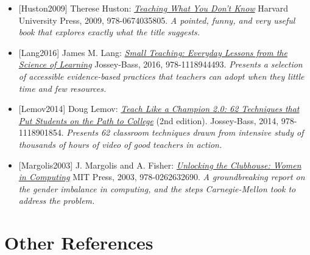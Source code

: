 \documentclass[10pt,statementpaper]{memoir}
\begin{document}
\begin{itemize}
{  Design of Computing Education: Research on Computing for Everyone}
  Morgan \& Claypool, 2015, 978-1627053518. \emph{An evidence-based
  argument that we must design computing education for everyone, not
  just people who think they are going to become professional
  programmers.}
\item
  \protect\hypertarget{huston-dont-know}{}{{[}Huston2009{]}} Therese
  Huston:
  \emph{\href{https://www.amazon.com/Teaching-What-You-Dont-Know/dp/0674035801/}{Teaching
  What You Don't Know}} Harvard University Press, 2009, 978-0674035805.
  \emph{A pointed, funny, and very useful book that explores exactly
  what the title suggests.}
\item
  \protect\hypertarget{lang-small-teaching}{}{{[}Lang2016{]}} James M.
  Lang:
  \emph{\href{https://www.amazon.com/Small-Teaching-Everyday-Lessons-Learning/dp/1118944496/}{Small
  Teaching: Everyday Lessons from the Science of Learning}} Jossey-Bass,
  2016, 978-1118944493. \emph{Presents a selection of accessible
  evidence-based practices that teachers can adopt when they little time
  and few resources.}
\item
  \protect\hypertarget{lemov-champion}{}{{[}Lemov2014{]}} Doug Lemov:
  \emph{\href{https://www.amazon.com/Teach-Like-Champion-2-0-Techniques/dp/1118901851/}{Teach
  Like a Champion 2.0: 62 Techniques that Put Students on the Path to
  College}} (2nd edition). Jossey-Bass, 2014, 978-1118901854.
  \emph{Presents 62 classroom techniques drawn from intensive study of
  thousands of hours of video of good teachers in action.}
\item
  \protect\hypertarget{margolis-fisher-clubhouse}{}{{[}Margolis2003{]}}
  J. Margolis and A. Fisher:
  \emph{\href{https://www.amazon.com/Unlocking-Clubhouse-Women-Computing-Press/dp/0262632691/}{Unlocking
  the Clubhouse: Women in Computing}} MIT Press, 2003, 978-0262632690.
  \emph{A groundbreaking report on the gender imbalance in computing,
  and the steps Carnegie-Mellon took to address the problem.}
\end{itemize}

\section{Other References}\label{other-references}
\end{document}

